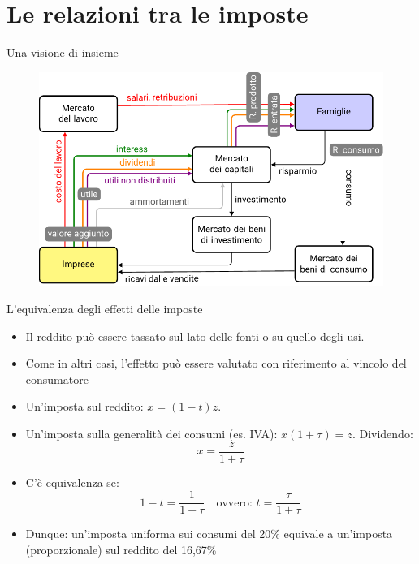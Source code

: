 \documentclass[aspectratio=64,11pt]{beamer}
\begin{document}
\section{Le relazioni tra le imposte}

\begin{frame}{Una visione di insieme}
\begin{figure}[htbp]
\centering
\includegraphics[width=\textwidth]{./figure/flussi-imposte-1.pdf}
\end{figure}
\end{frame}

\begin{frame}{L'equivalenza degli effetti delle imposte}
\begin{itemize}
\item Il reddito può essere tassato sul lato delle fonti o su quello degli usi.
\item Come in altri casi, l'effetto può essere valutato con riferimento al vincolo
del consumatore
\item Un'imposta sul reddito: $x=(1-t)z$.
\item Un'imposta sulla generalità dei consumi (es. IVA): $x(1+\tau)=z$.
Dividendo:
\begin{equation*}
   x = \frac{z}{1+\tau}
\end{equation*}
\item C'è equivalenza se:
\begin{equation*}
   1-t = \frac{1}{1+\tau} \quad\text{ovvero: }t = \frac{\tau}{1+\tau}
\end{equation*}
\item Dunque: un'imposta uniforma sui consumi del 20\% equivale a un'imposta
(proporzionale) sul reddito del 16,67\%
\end{itemize}
\end{frame}
\end{document}

